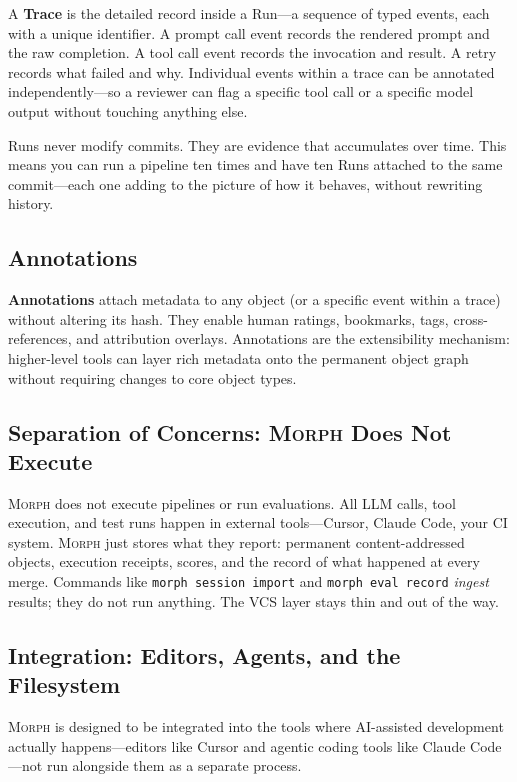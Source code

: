 \documentclass{article}
\begin{document}
A \textbf{Trace} is the detailed record inside a Run---a sequence of typed
events, each with a unique identifier. A prompt call event records the rendered
prompt and the raw completion. A tool call event records the invocation and
result. A retry records what failed and why. Individual events within a trace
can be annotated independently---so a reviewer can flag a specific tool call or
a specific model output without touching anything else.

Runs never modify commits. They are evidence that accumulates over time. This
means you can run a pipeline ten times and have ten Runs attached to the same
commit---each one adding to the picture of how it behaves, without rewriting
history.

\subsection{Annotations}

\textbf{Annotations} attach metadata to any object (or a specific event within
a trace) without altering its hash. They enable human ratings, bookmarks, tags,
cross-references, and attribution overlays. Annotations are the extensibility
mechanism: higher-level tools can layer rich metadata onto the permanent object
graph without requiring changes to core object types.

\subsection{Separation of Concerns: \textsc{Morph} Does Not Execute}

\textsc{Morph} does not execute pipelines or run evaluations. All LLM calls,
tool execution, and test runs happen in external tools---Cursor, Claude Code,
your CI system. \textsc{Morph} just stores what they report: permanent
content-addressed objects, execution receipts, scores, and the record of what
happened at every merge. Commands like \texttt{morph session import} and
\texttt{morph eval record} \emph{ingest} results; they do not run anything.
The VCS layer stays thin and out of the way.

\subsection{Integration: Editors, Agents, and the Filesystem}

\textsc{Morph} is designed to be integrated into the tools where AI-assisted
development actually happens---editors like Cursor and agentic coding tools like
Claude Code---not run alongside them as a separate process.
\end{document}
